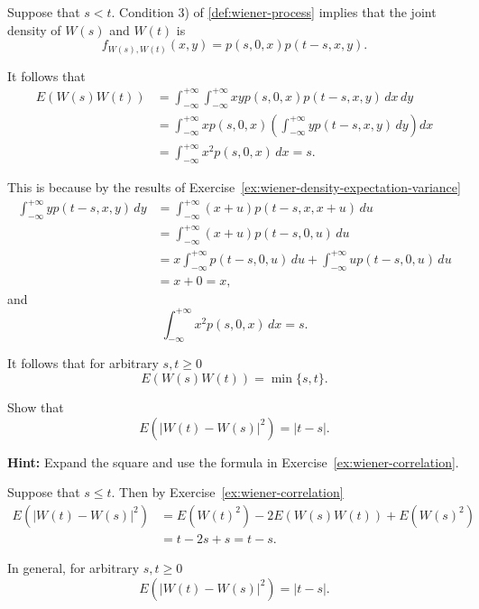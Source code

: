 \begin{Solution}
Suppose that $s < t$. Condition 3) of \cref{def:wiener-process} implies that the joint density of $W(s)$ and $W(t)$ is
\[
f_{W(s), W(t)}(x, y) = p(s, 0, x) p(t - s, x, y).
\]

It follows that
\begin{equation}
\begin{aligned}
E(W(s)W(t)) &= \int_{-\infty}^{+\infty} \int_{-\infty}^{+\infty} x y p(s, 0, x) p(t - s, x, y) \, dx \, dy \\
&= \int_{-\infty}^{+\infty} x p(s, 0, x) \left(\int_{-\infty}^{+\infty} y p(t - s, x, y) \, dy\right) dx \\
&= \int_{-\infty}^{+\infty} x^2 p(s, 0, x) \, dx = s.
\end{aligned}
\end{equation}

This is because by the results of Exercise~\ref{ex:wiener-density-expectation-variance}
\begin{equation}
\begin{aligned}
\int_{-\infty}^{+\infty} y p(t - s, x, y) \, dy &= \int_{-\infty}^{+\infty} (x + u) p(t - s, x, x + u) \, du \\
&= \int_{-\infty}^{+\infty} (x + u) p(t - s, 0, u) \, du \\
&= x \int_{-\infty}^{+\infty} p(t - s, 0, u) \, du + \int_{-\infty}^{+\infty} u p(t - s, 0, u) \, du \\
&= x + 0 = x,
\end{aligned}
\end{equation}
and
\[
\int_{-\infty}^{+\infty} x^2 p(s, 0, x) \, dx = s.
\]

It follows that for arbitrary $s, t \geq 0$
\[
E(W(s)W(t)) = \min\{s, t\}.
\]
\end{Solution}

\begin{Exercise}
\label{ex:wiener-increment-mse}
Show that
\[
E\left(|W(t) - W(s)|^2\right) = |t - s|.
\]

\noindent\textbf{Hint:} Expand the square and use the formula in Exercise~\ref{ex:wiener-correlation}.
\end{Exercise}

\begin{Solution}
Suppose that $s \leq t$. Then by Exercise~\ref{ex:wiener-correlation}
\begin{equation}
\begin{aligned}
E\left(|W(t) - W(s)|^2\right) &= E(W(t)^2) - 2E(W(s)W(t)) + E(W(s)^2) \\
&= t - 2s + s = t - s.
\end{aligned}
\end{equation}

In general, for arbitrary $s, t \geq 0$
\[
E\left(|W(t) - W(s)|^2\right) = |t - s|.
\]
\end{Solution}

